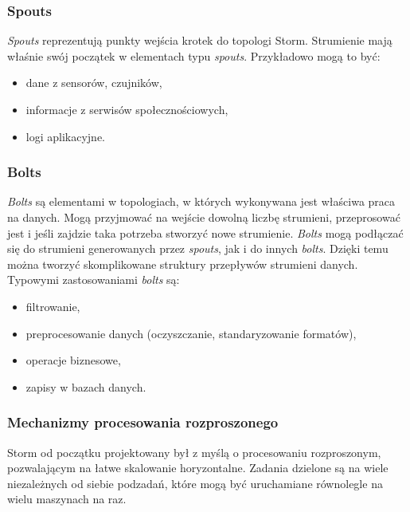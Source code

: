 \subsubsection*{Spouts}
\textit{Spouts} reprezentują punkty wejścia krotek do topologi Storm.
Strumienie mają właśnie swój początek w elementach typu \textit{spouts}.
Przykładowo mogą to być:
\begin{itemize}
  \item dane z sensorów, czujników,
  \item informacje z serwisów społecznościowych,
  \item logi aplikacyjne.
\end{itemize}
\subsubsection*{Bolts}
\textit{Bolts} są elementami w topologiach,
w których wykonywana jest właściwa praca na danych.
Mogą przyjmować na wejście dowolną liczbę strumieni,
przeprosować jest
i jeśli zajdzie taka potrzeba stworzyć nowe strumienie.
\textit{Bolts} mogą podłączać się do strumieni generowanych przez \textit{spouts},
jak i do innych \textit{bolts}.
Dzięki temu można tworzyć skomplikowane struktury przepływów strumieni danych.
Typowymi zastosowaniami \textit{bolts} są:
\begin{itemize}
  \item filtrowanie,
  \item preprocesowanie danych (oczyszczanie, standaryzowanie formatów),
  \item operacje biznesowe,
  \item zapisy w bazach danych.
\end{itemize}

\subsubsection*{Mechanizmy procesowania rozproszonego}
Storm od początku projektowany był z myślą o procesowaniu rozproszonym,
pozwalającym na łatwe skalowanie horyzontalne.
Zadania dzielone są na wiele niezależnych od siebie podzadań,
które mogą być uruchamiane równolegle na wielu maszynach na raz.

